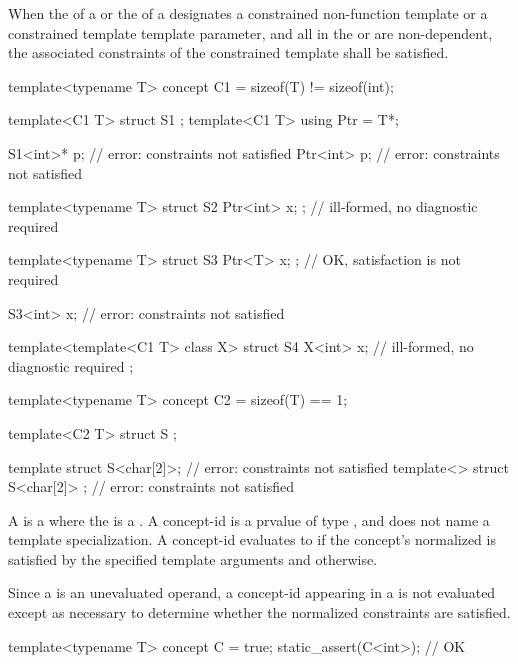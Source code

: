 \pnum
When the 
of a  or
the 
of a 
designates a constrained non-function template
or
a constrained template template parameter,
and
all 
in the  or
are non-dependent,
the associated constraints
of the constrained template
shall be satisfied.
\begin{example}
\begin{codeblock}
template<typename T> concept C1 = sizeof(T) != sizeof(int);

template<C1 T> struct S1 { };
template<C1 T> using Ptr = T*;

S1<int>* p;                         // error: constraints not satisfied
Ptr<int> p;                         // error: constraints not satisfied

template<typename T>
struct S2 { Ptr<int> x; };          // ill-formed, no diagnostic required

template<typename T>
struct S3 { Ptr<T> x; };            // OK, satisfaction is not required

S3<int> x;                          // error: constraints not satisfied

template<template<C1 T> class X>
struct S4 {
  X<int> x;                         // ill-formed, no diagnostic required
};

template<typename T> concept C2 = sizeof(T) == 1;

template<C2 T> struct S { };

template struct S<char[2]>;         // error: constraints not satisfied
template<> struct S<char[2]> { };   // error: constraints not satisfied
\end{codeblock}
\end{example}

\pnum
A  is a 
where the  is a .
A concept-id is a prvalue of type , and
does not name a template specialization.
A concept-id evaluates to 
if the concept's
normalized 
is satisfied by the specified template arguments and
 otherwise.
\begin{note}
Since a  is an unevaluated operand,
a concept-id appearing in a 
is not evaluated except as necessary
to determine whether the normalized constraints are satisfied.
\end{note}
\begin{example}
\begin{codeblock}
template<typename T> concept C = true;
static_assert(C<int>);      // OK
\end{codeblock}
\end{example}

